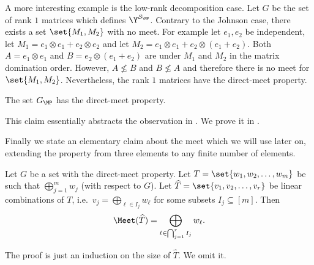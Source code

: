 \begin{example}
   A more interesting example is the low-rank decomposition case. Let \(G\) be the set of rank \(1\) matrices which defines \(\Y^{\mathcal{S}_{\MP}}\). Contrary to the Johnson case, there exists a set \(\set{M_1,M_2}\) with no meet. For example let \(e_1,e_2\) be independent, let \(M_1=e_1 \otimes e_1 + e_2 \otimes e_2\) and let \(M_2 = e_1\otimes e_1 + e_2 \otimes (e_1+e_2)\). Both \(A = e_1 \otimes e_1\) and \(B = e_2 \otimes (e_1+e_2)\) are under \(M_1\) and \(M_2\) in the matrix domination order. However, \(A \not \leq B\) and \(B \not \leq A\) and therefore there is no meet for \(\set{M_1,M_2}\). Nevertheless, the rank \(1\) matrices have the direct-meet property.

\begin{claim} \label{claim:direct-meet-matrix-poset}
    The set \(G_{\MP}\) has the direct-meet property.
\end{claim}
This claim essentially abstracts the observation in \cite[Lemma 57]{Golowich2023}. We prove it in .
\end{example}

Finally we state an elementary claim about the meet which we will use later on, extending the property from three elements to any finite number of elements.
\begin{claim} \label{claim:extended-direct-meet-property}
    Let \(G\) be a set with the direct-meet property. Let \(T=\set{w_1,w_2,\dots,w_m}\) be such that \(\bigoplus_{j=1}^m w_j\) (with respect to $G$). Let \(\widehat{T} = \set{v_1,v_2,\dots,v_r}\) be linear combinations of \(T\), i.e.\ \(v_j = \bigoplus_{\ell \in I_j}w_\ell\) for some subsets \(I_j \subseteq [m]\). Then \[\Meet(\widehat{T}) = \bigoplus_{\ell \in \bigcap_{j=1}^r I_j} w_\ell.\]
\end{claim}
The proof is just an induction on the size of \(\widehat{T}\). We omit it.
